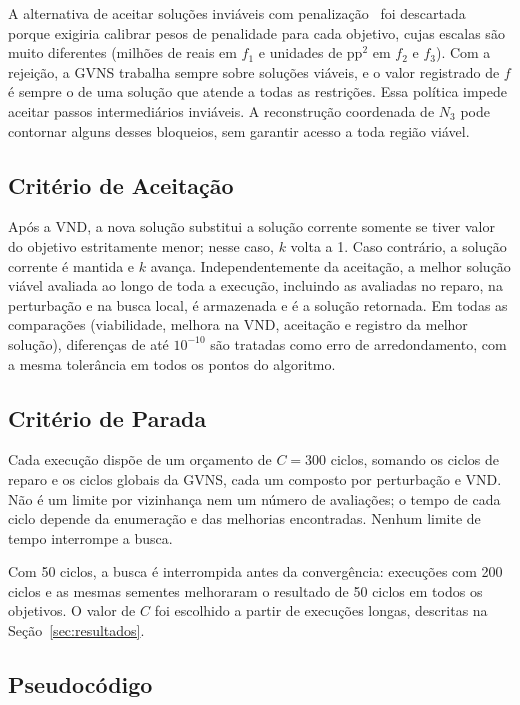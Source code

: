 \documentclass[conference]{IEEEtran}
\newcommand{\Cparada}{300}
\begin{document}
A alternativa de aceitar soluções inviáveis com penalização~\cite{aula04} foi descartada porque exigiria calibrar pesos de penalidade para cada objetivo, cujas escalas são muito diferentes (milhões de reais em $f_1$ e unidades de pp$^2$ em $f_2$ e $f_3$). Com a rejeição, a GVNS trabalha sempre sobre soluções viáveis, e o valor registrado de $f$ é sempre o de uma solução que atende a todas as restrições. Essa política impede aceitar passos intermediários inviáveis. A reconstrução coordenada de $N_3$ pode contornar alguns desses bloqueios, sem garantir acesso a toda região viável.

\subsection{Critério de Aceitação}

Após a VND, a nova solução substitui a solução corrente somente se tiver valor do objetivo estritamente menor; nesse caso, $k$ volta a 1. Caso contrário, a solução corrente é mantida e $k$ avança. Independentemente da aceitação, a melhor solução viável avaliada ao longo de toda a execução, incluindo as avaliadas no reparo, na perturbação e na busca local, é armazenada e é a solução retornada. Em todas as comparações (viabilidade, melhora na VND, aceitação e registro da melhor solução), diferenças de até $10^{-10}$ são tratadas como erro de arredondamento, com a mesma tolerância em todos os pontos do algoritmo.

\subsection{Critério de Parada}

Cada execução dispõe de um orçamento de $C=\Cparada$ ciclos, somando os ciclos de reparo e os ciclos globais da GVNS, cada um composto por perturbação e VND. Não é um limite por vizinhança nem um número de avaliações; o tempo de cada ciclo depende da enumeração e das melhorias encontradas. Nenhum limite de tempo interrompe a busca.

Com 50 ciclos, a busca é interrompida antes da convergência: execuções com 200 ciclos e as mesmas sementes melhoraram o resultado de 50 ciclos em todos os objetivos. O valor de $C$ foi escolhido a partir de execuções longas, descritas na Seção~\ref{sec:resultados}.

\subsection{Pseudocódigo}
\end{document}
